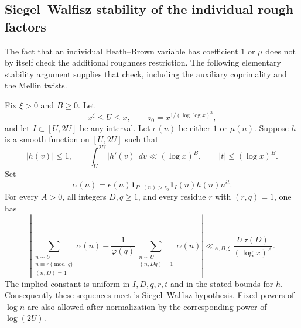 
\subsection{Siegel--Walfisz stability of the individual rough factors}
\label{sec:rough-sw-stability}

The fact that an individual Heath--Brown variable has coefficient
$1$ or $\mu$ does not by itself check the additional roughness
restriction. The following elementary stability argument supplies
that check, including the auxiliary coprimality and the Mellin twists.

\begin{lemma}
\label{lem:rough-sw}
Fix $\xi>0$ and $B\ge0$. Let
\[
 x^\xi\le U\le x,\qquad z_0=x^{1/(\log\log x)^3},
\]
and let $I\subset[U,2U]$ be any interval.
Let $e(n)$ be either $1$ or $\mu(n)$.
Suppose $h$ is a smooth function on $[U,2U]$ such that
\[
 |h(v)|\le1,\qquad
 \int_U^{2U}|h'(v)|\,dv\ll(\log x)^B,
 \qquad |t|\le(\log x)^B.
\]
Set
\[
 \alpha(n)=e(n)\mathbf1_{P^-(n)>z_0}\mathbf1_I(n)
                  h(n)n^{it}.
\]
For every $A>0$, all integers $D,q\ge1$, and every residue $r$
with $(r,q)=1$, one has
\begin{equation}\label{eq:rough-sw-full}
 \left|
 \sum_{\substack{n\sim U\\n\equiv r\pmod q\\(n,D)=1}}\alpha(n)
 -\frac1{\varphi(q)}
       \sum_{\substack{n\sim U\\(n,Dq)=1}}\alpha(n)
 \right|
 \ll_{A,B,\xi}\frac{U\,\tau(D)}{(\log x)^A}.
\end{equation}
The implied constant is uniform in $I,D,q,r,t$ and in the stated
bounds for $h$. Consequently these sequences meet
\cite[Definition 2.1 and Proposition 5.2]{Lichtman2023}'s
Siegel--Walfisz hypothesis. Fixed powers of $\log n$ are also
allowed after normalization by the corresponding power of
$\log(2U)$.
\end{lemma}

